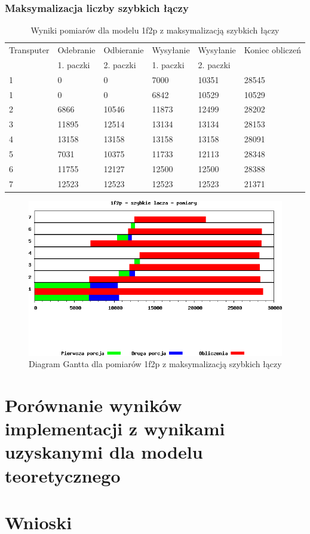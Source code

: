 \documentclass[a4paper,11pt, titlepage]{article}
\begin{document}
\subsubsection{Maksymalizacja liczby szybkich łączy}
\begin{table}[hp!]
\begin{tabular}{|l|l|l|l|l|l|}\hline
Transputer&Odebranie&Odbieranie&Wysyłanie&Wysyłanie&Koniec obliczeń\\
&1. paczki&2. paczki&1. paczki&2. paczki&\\ \hline
1&0&0&7000&10351&28545\\ \hline
1&0&0&6842&10529&10529\\ \hline
2&6866&10546&11873&12499&28202\\ \hline
3&11895&12514&13134&13134&28153\\ \hline
4&13158&13158&13158&13158&28091\\ \hline
5&7031&10375&11733&12113&28348\\ \hline
6&11755&12127&12500&12500&28388\\ \hline
7&12523&12523&12523&12523&21371\\ \hline
\end{tabular}
\caption{Wyniki pomiarów dla modelu 1f2p z maksymalizacją szybkich łączy \label{i2f1p_l}}
\end{table}
\begin{figure}[hp!]
\includegraphics[width=1.0\textwidth]{wykresy/i2p1f_lacza}
\caption{Diagram Gantta dla pomiarów 1f2p z maksymalizacją szybkich łączy \label{i2p1f_lg}}
\end{figure}
\section{Porównanie wyników implementacji z wynikami uzyskanymi dla modelu teoretycznego}
\section{Wnioski}
\end{document}

